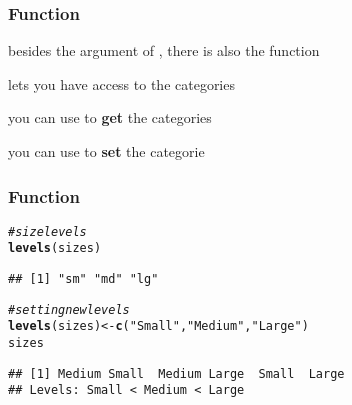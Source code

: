 \documentclass[12pt]{beamer}\usepackage[]{graphicx}\usepackage[]{color}
\makeatletter
\newcommand{\hlstr}[1]{\textcolor[rgb]{0.192,0.494,0.8}{#1}}%
\newcommand{\hlcom}[1]{\textcolor[rgb]{0.678,0.584,0.686}{\textit{#1}}}%
\newcommand{\hlstd}[1]{\textcolor[rgb]{0.345,0.345,0.345}{#1}}%
\newcommand{\hlkwb}[1]{\textcolor[rgb]{0.69,0.353,0.396}{#1}}%
\newcommand{\hlkwd}[1]{\textcolor[rgb]{0.737,0.353,0.396}{\textbf{#1}}}%
\newenvironment{kframe}{%
 \def\at@end@of@kframe{}%
 \ifinner\ifhmode%
  \def\at@end@of@kframe{\end{minipage}}%
  \begin{minipage}{\columnwidth}%
 \fi\fi%
 \def\FrameCommand##1{\hskip\@totalleftmargin \hskip-\fboxsep
 \colorbox{shadecolor}{##1}\hskip-\fboxsep
     \hskip-\linewidth \hskip-\@totalleftmargin \hskip\columnwidth}%
 \MakeFramed {\advance\hsize-\width
   \@totalleftmargin\z@ \linewidth\hsize
   \@setminipage}}%
 {\par\unskip\endMakeFramed%
 \at@end@of@kframe}
\newenvironment{knitrout}{}{} %
\makeatother
\begin{document}

\begin{frame}
\frametitle{Function }

\bi
  \item besides the argument  of , there is also the function 
  \item {} lets you have access to the categories
  \item you can use  to \textbf{get} the categories
  \item you can use  to \textbf{set} the categorie\ei

\end{frame}


\begin{frame}[fragile]
\frametitle{Function }

\begin{knitrout}\footnotesize
{}\color{fgcolor}\begin{kframe}
\begin{alltt}
\hlcom{# size levels}
\hlkwd{levels}\hlstd{(sizes)}
\end{alltt}
\begin{verbatim}
## [1] "sm" "md" "lg"
\end{verbatim}
\begin{alltt}
\hlcom{# setting new levels}
\hlkwd{levels}\hlstd{(sizes)} \hlkwb{<-} \hlkwd{c}\hlstd{(}\hlstr{"Small"}\hlstd{,} \hlstr{"Medium"}\hlstd{,} \hlstr{"Large"}\hlstd{)}
\hlstd{sizes}
\end{alltt}
\begin{verbatim}
## [1] Medium Small  Medium Large  Small  Large 
## Levels: Small < Medium < Large
\end{verbatim}
\end{kframe}
\end{knitrout}

\end{frame}

\end{document}
